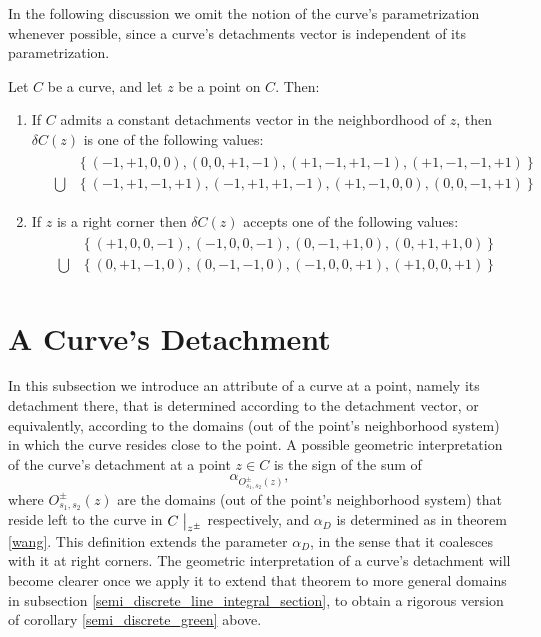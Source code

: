 \documentclass[11pt]{book}
\begin{document}
In the following discussion we omit the notion of the curve's parametrization whenever possible, since a curve's detachments vector is independent of its parametrization.

\begin{remark}\label{curve_detachment_vector_possible_values}Let $C$ be a curve, and let $z$ be a point on $C$. Then:
\begin{enumerate}
\item If $C$ admits a constant detachments vector in the neighbordhood
of $z$, then $\delta C\left(z\right)$ is one of the following values:
\begin{align}
&\begin{aligned}
 & \left\{ \left(-1,+1,0,0\right),\left(0,0,+1,-1\right),\left(+1,-1,+1,-1\right),\left(+1,-1,-1,+1\right)\right\} \\
\bigcup & \left\{ \left(-1,+1,-1,+1\right),\left(-1,+1,+1,-1\right),\left(+1,-1,0,0\right),\left(0,0,-1,+1\right)\right\} 
\end{aligned}
\end{align}
\item If $z$ is a right corner then $\delta C\left(z\right)$ accepts one
of the following values:
\begin{align}
&\begin{aligned}
 & \left\{ \left(+1,0,0,-1\right),\left(-1,0,0,-1\right),\left(0,-1,+1,0\right),\left(0,+1,+1,0\right)\right\} \\
\bigcup & \left\{ \left(0,+1,-1,0\right),\left(0,-1,-1,0\right),\left(-1,0,0,+1\right),\left(+1,0,0,+1\right)\right\} 
\end{aligned}
\end{align}
\end{enumerate}
\end{remark}

\section{A Curve's Detachment}In this subsection we introduce an attribute of a curve at a point, namely its detachment there, that is determined according to the detachment vector, or equivalently, according to the domains (out of the point's neighborhood system) in which the curve resides close to the point.
A possible geometric interpretation of the curve's detachment at a point $z\in C$ is the sign of the sum of
\[
\alpha_{O_{s_{1},s_{2}}^{\pm}\left(z\right)},
\]
where $O_{s_{1},s_{2}}^{\pm}\left(z\right)$ are the domains (out
of the point's neighborhood system) that reside left to the curve in $C\bigm\lvert_{z^{\pm}}$ respectively, and $\alpha_{D}$
is determined as in theorem \ref{wang}. This definition extends the parameter
$\alpha_{D}$, in the sense that it coalesces with it at right corners.
The geometric interpretation of a curve's detachment will become clearer once we apply it to extend that theorem to more general domains in subsection \ref{semi_discrete_line_integral_section}, to obtain a rigorous version of corollary \ref{semi_discrete_green} above.
\end{document}
